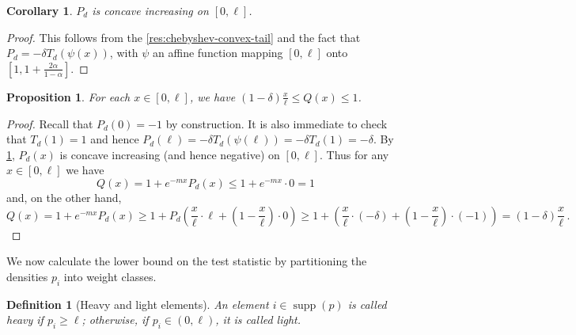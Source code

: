\documentclass[10pt,a4paper]{article}
\newtheorem{proposition}{Proposition}[section]
\newtheorem{corollary}{Corollary}[section]
\newtheorem{definition}{Definition}[section]
\DeclareMathOperator{\supp}{supp}   %
\begin{document}
\begin{corollary}
    \label{res:pd-concave}
    $P_d$ is concave increasing on $[0, \ell]$.
\end{corollary}
\begin{proof}
    This follows from the \cref{res:chebyshev-convex-tail} and the fact that $P_d = -\delta
    T_d(\psi(x))$, with $\psi$ an affine function mapping $[0, \ell]$ onto $\left[ 1, 1 +
    \frac{2\alpha}{1-\alpha} \right]$.
\end{proof}

\begin{proposition}
    \label{res:q-light-bounds}
    For each $x \in [0, \ell]$, we have $(1-\delta) \frac{x}{\ell} \le Q(x) \le 1$.
\end{proposition}
\begin{proof}
    Recall that $P_d(0) = -1$ by construction. It is also immediate to check that $T_d(1) = 1$ and
    hence $P_d(\ell) = -\delta T_d(\psi(\ell)) = -\delta T_d(1) = -\delta$. By
    \cref{res:pd-concave}, $P_d(x)$ is concave increasing (and hence negative) on $[0, \ell]$.
    Thus for any $x \in [0, \ell]$ we have
    \[
        Q(x) = 1 + e^{-mx} P_d(x)
        \le 1 + e^{-mx} \cdot 0
        = 1
    \]
    and, on the other hand,
    \[
        Q(x) = 1 + e^{-mx} P_d(x)
        \ge 1 + P_d\left(
            \frac{x}{\ell} \cdot \ell + \left(1-\frac{x}{\ell}\right) \cdot 0
        \right)
        \ge 1 + \left(
            \frac{x}{\ell} \cdot (-\delta) + \left(1-\frac{x}{\ell}\right) \cdot (-1)
        \right)
        = (1-\delta) \frac{x}{\ell} \,.
    \]
\end{proof}

We now calculate the lower bound on the test statistic by partitioning the densities $p_i$ into
weight classes.

\begin{definition}[Heavy and light elements]
    \label{def:heavy}
    An element $i \in \supp(p)$ is called \emph{heavy} if $p_i \ge \ell$;
    otherwise, if $p_i \in (0, \ell)$, it is called \emph{light}.
\end{definition}
\end{document}
